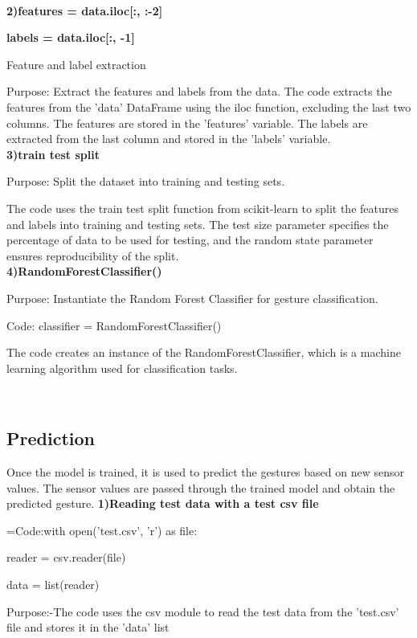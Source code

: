 \documentclass[a4paper,12pt,oneside]{report}
\begin{document}
\\
\textbf{\large 2)features = data.iloc[:, :-2]}
\par
  \textbf{\large labels = data.iloc[:, -1]}
\par
Feature and label extraction       
\par
 Purpose: Extract the features and labels from the data.
 The code extracts the features from the 'data' DataFrame using the iloc function, excluding the last two columns. The features are stored in the 'features' variable. The labels are extracted from the last column and stored in the 'labels' variable.
\\
\textbf{\large 3)train test split }
\par
Purpose: Split the dataset into training and testing sets.
\par
The code uses the train test split function from scikit-learn to split the features and labels into training and testing sets. The test size parameter specifies the percentage of data to be used for testing, and the random state parameter ensures reproducibility of the split.
\\
\textbf{\large 4)RandomForestClassifier() }
\par
Purpose: Instantiate the Random Forest Classifier for gesture classification.
\par
Code: classifier = RandomForestClassifier()
\par
The code creates an instance of the RandomForestClassifier, which is a machine learning algorithm used for classification tasks.

\\



 \subsection{Prediction}
 Once the model is trained, it is used to predict the
gestures based on new sensor values. The sensor values are
passed through the trained model and obtain the predicted
gesture.
\textbf{\large 1)Reading test data with a test csv file }
\par
=Code:with open('test.csv', 'r') as file:
\par
	reader = csv.reader(file)
 \par
	data = list(reader)

\par
Purpose:-The code uses the csv module to read the test data from the 'test.csv' file and stores it in the 'data' list
\\
\par
\end{document}
